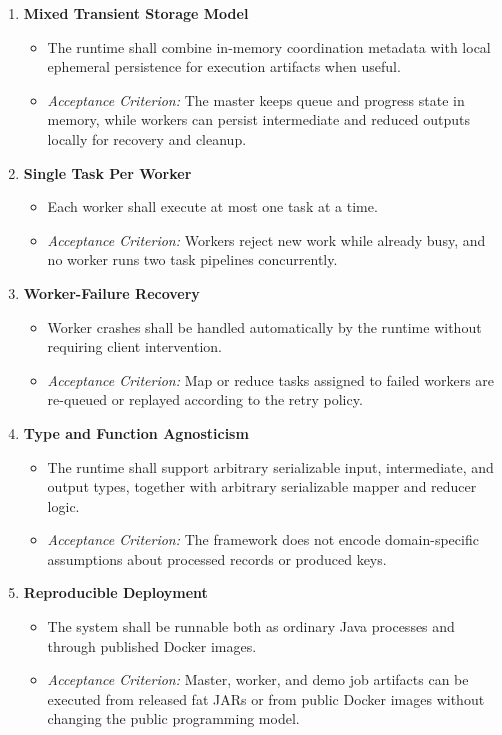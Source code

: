 \documentclass{scrartcl}
\begin{document}
\begin{enumerate}[label=\textbf{NFR-\arabic*}]
    \item \textbf{Mixed Transient Storage Model}
          \begin{itemize}
              \item The runtime shall combine in-memory coordination metadata with local ephemeral persistence for execution artifacts when useful.
              \item \textit{Acceptance Criterion:} The master keeps queue and progress state in memory, while workers can persist intermediate and reduced outputs locally for recovery and cleanup.
          \end{itemize}

    \item \textbf{Single Task Per Worker}
          \begin{itemize}
              \item Each worker shall execute at most one task at a time.
              \item \textit{Acceptance Criterion:} Workers reject new work while already busy, and no worker runs two task pipelines concurrently.
          \end{itemize}

    \item \textbf{Worker-Failure Recovery}
          \begin{itemize}
              \item Worker crashes shall be handled automatically by the runtime without requiring client intervention.
              \item \textit{Acceptance Criterion:} Map or reduce tasks assigned to failed workers are re-queued or replayed according to the retry policy.
          \end{itemize}

    \item \textbf{Type and Function Agnosticism}
          \begin{itemize}
              \item The runtime shall support arbitrary serializable input, intermediate, and output types, together with arbitrary serializable mapper and reducer logic.
              \item \textit{Acceptance Criterion:} The framework does not encode domain-specific assumptions about processed records or produced keys.
          \end{itemize}

    \item \textbf{Reproducible Deployment}
          \begin{itemize}
              \item The system shall be runnable both as ordinary Java processes and through published Docker images.
              \item \textit{Acceptance Criterion:} Master, worker, and demo job artifacts can be executed from released fat JARs or from public Docker images without changing the public programming model.
          \end{itemize}


\end{enumerate}
\end{document}

